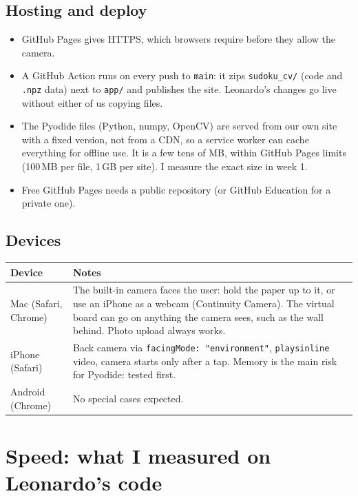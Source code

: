\documentclass[11pt]{article}
\begin{document}
\subsection*{Hosting and deploy}

\begin{itemize}
  \item GitHub Pages gives HTTPS, which browsers require before they allow the camera.
  \item A GitHub Action runs on every push to \texttt{main}: it zips \texttt{sudoku\_cv/} (code and
        \texttt{.npz} data) next to \texttt{app/} and publishes the site. Leonardo's changes go
        live without either of us copying files.
  \item The Pyodide files (Python, numpy, OpenCV) are served from our own site with a fixed version,
        not from a CDN, so a service worker can cache everything for offline use. It is a few tens
        of MB, within GitHub Pages limits (100\,MB per file, 1\,GB per site). I measure the
        exact size in week 1.
  \item Free GitHub Pages needs a public repository (or GitHub Education for a private one).
\end{itemize}

\subsection*{Devices}

\begin{tabularx}{\textwidth}{@{}lX@{}}
\toprule
Device & Notes \\
\midrule
Mac (Safari, Chrome) & The built-in camera faces the user: hold the paper up to it, or use an
  iPhone as a webcam (Continuity Camera). The virtual board can go on anything the camera sees,
  such as the wall behind. Photo upload always works. \\
iPhone (Safari) & Back camera via \texttt{facingMode: "environment"}, \texttt{playsinline} video,
  camera starts only after a tap. Memory is the main risk for Pyodide: tested first. \\
Android (Chrome) & No special cases expected. \\
\bottomrule
\end{tabularx}

\section{Speed: what I measured on Leonardo's code}\label{sec:speed}
\end{document}
